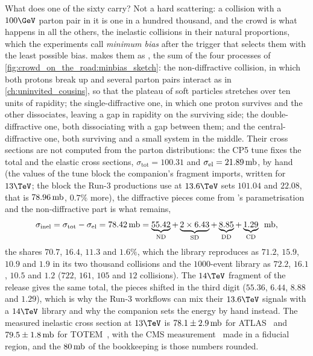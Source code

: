 What does one of the sixty carry? Not a hard scattering: a collision with
a $100\GeV$ parton pair in it is one in a hundred thousand, and the crowd
is what happens in all the others, the inelastic collisions in their
natural proportions, which the experiments call \emph{minimum bias} after
the trigger that selects them with the least possible bias. \PYTHIA makes
them as , the sum of the four processes of
\cref{fig:crowd_on_the_road:minbias_sketch}: the non-diffractive
collision, in which both protons break up and several parton pairs
interact as in \cref{ch:uninvited_cousins}, so that the plateau of soft
particles stretches over ten units of rapidity; the single-diffractive
one, in which one proton survives and the other dissociates, leaving a
gap in rapidity on the surviving side; the double-diffractive one, both
dissociating with a gap between them; and the central-diffractive one,
both surviving and a small system in the middle. Their cross sections are
not computed from the parton distributions: the CP5 tune fixes the total
and the elastic cross sections, $\sigma_{\mathrm{tot}}=100.31$ and
$\sigma_{\mathrm{el}}=21.89\,\mathrm{mb}$, by hand (the values of the tune block the
companion's fragment imports, written for $13\TeV$; the block the Run-3
productions use at $13.6\TeV$ sets $101.04$ and $22.08$, that is
$78.96\,\mathrm{mb}$, $0.7\%$ more), the
diffractive pieces come from \PYTHIA's parametrisation and the
non-diffractive part is what remains,
\begin{equation}
  \sigmainel=\sigma_{\mathrm{tot}}-\sigma_{\mathrm{el}}=78.42\mbarn
  =\underbrace{55.42}_{\mathrm{ND}}+\underbrace{2\times6.43}_{\mathrm{SD}}+\underbrace{8.85}_{\mathrm{DD}}+\underbrace{1.29}_{\mathrm{CD}}\ \mbarn,
  \label{eq:crowd_on_the_road:sigma}
\end{equation}
the shares $70.7$, $16.4$, $11.3$ and $1.6\%$, which the library
reproduces as $71.2$, $15.9$, $10.9$ and $1.9$ in its two thousand
collisions and the $1000$-event \CMSSW library as $72.2$, $16.1$, $10.5$
and $1.2$ ($722$, $161$, $105$ and $12$ collisions). The $14\TeV$ fragment of the release gives the same total, the pieces
shifted in the third digit ($55.36$, $6.44$, $8.88$ and $1.29$), which is why the Run-3 workflows can mix their
$13.6\TeV$ signals with a $14\TeV$ library and why the companion sets the
energy by hand instead. The measured inelastic cross section at $13\TeV$
is $78.1\pm2.9\,\mathrm{mb}$ for ATLAS~\cite{ATLAS:2016ygv} and
$79.5\pm1.8\,\mathrm{mb}$ for TOTEM~\cite{TOTEM:2017asr}, with the CMS
measurement~\cite{CMS:2018mlc} made in a fiducial region, and the
$80\,\mathrm{mb}$ of the bookkeeping is those numbers rounded.


